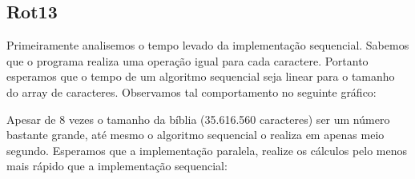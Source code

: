 \documentclass[12pt]{article}
\begin{document}
\subsection{Rot13}

Primeiramente analisemos o tempo levado da implementação sequencial.
Sabemos que o programa realiza uma operação igual para cada caractere.
Portanto esperamos que o tempo de um algoritmo sequencial seja linear
para o tamanho do array de caracteres. Observamos tal comportamento no
seguinte gráfico:

\begin{figure}[H]
\end{figure}

Apesar de 8 vezes o tamanho da bíblia (35.616.560 caracteres) ser um
número bastante grande, até mesmo o algoritmo sequencial o realiza em
apenas meio segundo. Esperamos que a implementação paralela, realize os
cálculos pelo menos mais rápido que a implementação sequencial:

\begin{figure}[H]
\end{figure}
\end{document}
